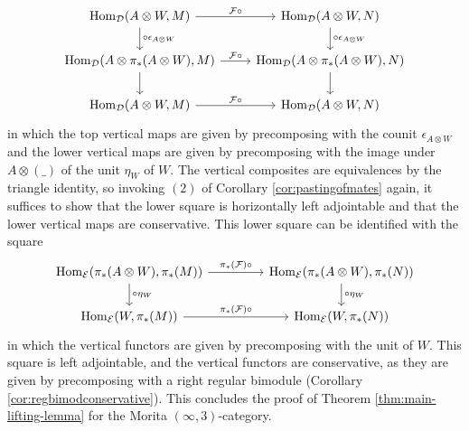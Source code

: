 \documentclass[10pt, reqno, twoside
, final
]{amsart}
\numberwithin{equation}{subsection}%
\theoremstyle{definition}
\theoremstyle{definition}
\theoremstyle{definition}
\theoremstyle{definition}
\theoremstyle{definition}
\theoremstyle{definition}
\theoremstyle{definition}
\theoremstyle{definition}
\theoremstyle{definition}
\theoremstyle{plain}
\theoremstyle{definition}
\theoremstyle{plain}
\theoremstyle{definition}
\theoremstyle{plain}
\theoremstyle{definition}
\theoremstyle{definition}
\theoremstyle{plain}
\theoremstyle{plain}
\theoremstyle{definition}
\theoremstyle{plain}
\theoremstyle{plain}
\theoremstyle{plain}
\begin{document}
\[
\begin{tikzcd}
\Hom_{\icatd}(A\otimes W,M)  \arrow[r,"\F\circ "] \arrow[d,"\circ \epsilon_{A\otimes W}"]  & \Hom_{\icatd}(A\otimes W,N)  \ar[d,"\circ \epsilon_{A\otimes W}"] \\    \Hom_{\icatd}(A\otimes \pi_*(A\otimes W),M)\arrow[r,"\F\circ "]\ar[d] & \Hom_{\icatd}(A\otimes \pi_*(A\otimes  W),N) \ar[d]\\
\Hom_{\icatd}(A\otimes W,M)\arrow[r,"\F\circ "] &  \Hom_{\icatd}(A\otimes W,N) 
\end{tikzcd}
\]
in which the top vertical maps are given by precomposing with the counit $\epsilon_{A\otimes W}$ and the lower vertical maps are given by precomposing with the image under $A\otimes (\_)$ of the unit $\eta_W$ of $W$. The vertical composites are equivalences by the triangle identity, so invoking $(2)$ of Corollary \ref{cor:pastingofmates} again, it suffices to show that the lower square is horizontally left adjointable and that the lower vertical maps are conservative. This lower square can be identified with the square 
\[
\begin{tikzcd}
   \Hom_{\icate}( \pi_*(A\otimes W),\pi_*(M))\arrow[r,"\pi_*(\F)\circ "]\ar[d,"\circ \eta_W"] &[2em] \Hom_{\icate}(\pi_*(A\otimes W),\pi_*(N)) \ar[d,"\circ \eta_W"]\\
\Hom_{\icate}( W,\pi_*(M))\arrow[r,"\pi_*(\F)\circ "] &[2em]  \Hom_{\icate}( W,\pi_*(N))   
\end{tikzcd}
\]
in which the vertical functors are given by precomposing with the unit of $W$. This square is left adjointable, and the vertical functors are conservative, as they are given by precomposing with a right regular bimodule (Corollary \ref{cor:regbimodconservative}). This concludes the proof of Theorem \ref{thm:main-lifting-lemma} for the Morita $(\infty,3)$-category. 
\end{document}

